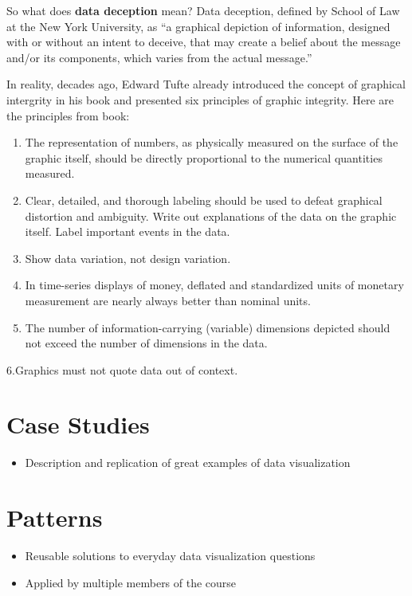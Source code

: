 \documentclass[]{book}
\providecommand{\tightlist}{%
  \setlength{\itemsep}{0pt}\setlength{\parskip}{0pt}}
\theoremstyle{definition}
\theoremstyle{definition}
\theoremstyle{definition}
\theoremstyle{remark}
\begin{document}
So what does \textbf{data deception} mean? Data deception, defined by
School of Law at the New York University, as ``a graphical depiction of
information, designed with or without an intent to deceive, that may
create a belief about the message and/or its components, which varies
from the actual message.''

In reality, decades ago, Edward Tufte already introduced the concept of
graphical intergrity in his book and presented six principles of graphic
integrity. Here are the principles from book:

\begin{enumerate}
\def\labelenumi{\arabic{enumi}.}
\item
  The representation of numbers, as physically measured on the surface
  of the graphic itself, should be directly proportional to the
  numerical quantities measured.
\item
  Clear, detailed, and thorough labeling should be used to defeat
  graphical distortion and ambiguity. Write out explanations of the data
  on the graphic itself. Label important events in the data.
\item
  Show data variation, not design variation.
\item
  In time-series displays of money, deﬂated and standardized units of
  monetary measurement are nearly always better than nominal units.
\item
  The number of information-carrying (variable) dimensions depicted
  should not exceed the number of dimensions in the data.
\end{enumerate}

6.Graphics must not quote data out of context.

\chapter{Case Studies}\label{case-studies}

\begin{itemize}
\tightlist
\item
  Description and replication of great examples of data visualization
\end{itemize}

\chapter{Patterns}\label{patterns}

\begin{itemize}
\tightlist
\item
  Reusable solutions to everyday data visualization questions
\item
  Applied by multiple members of the course
\end{itemize}
\end{document}
